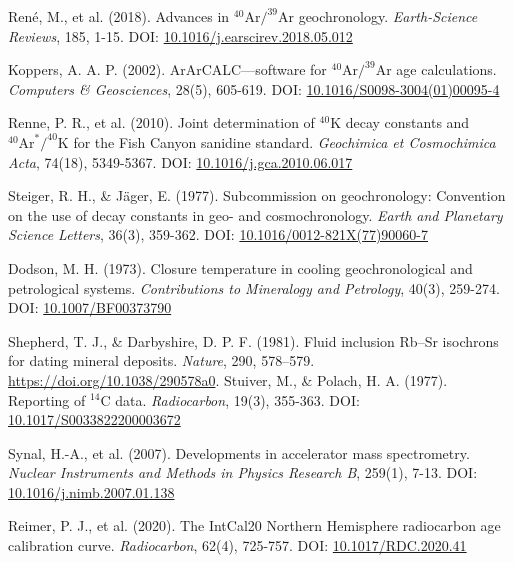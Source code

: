 \documentclass{article}
\begin{document}
\begin{thebibliography}{9}
René, M., et al. (2018). Advances in \(^{40}\text{Ar}/^{39}\text{Ar}\) geochronology. \textit{Earth-Science Reviews}, 185, 1-15.  
DOI: \href{https://doi.org/10.1016/j.earscirev.2018.05.012}{10.1016/j.earscirev.2018.05.012}

Koppers, A. A. P. (2002). ArArCALC—software for \(^{40}\text{Ar}/^{39}\text{Ar}\) age calculations. \textit{Computers & Geosciences}, 28(5), 605-619.  
DOI: \href{https://doi.org/10.1016/S0098-3004(01)00095-4}{10.1016/S0098-3004(01)00095-4}

Renne, P. R., et al. (2010). Joint determination of \(^{40}\text{K}\) decay constants and \(^{40}\text{Ar}^*/^{40}\text{K}\) for the Fish Canyon sanidine standard. \textit{Geochimica et Cosmochimica Acta}, 74(18), 5349-5367.  
DOI: \href{https://doi.org/10.1016/j.gca.2010.06.017}{10.1016/j.gca.2010.06.017}

Steiger, R. H., \& Jäger, E. (1977). Subcommission on geochronology: Convention on the use of decay constants in geo- and cosmochronology. \textit{Earth and Planetary Science Letters}, 36(3), 359-362.  
DOI: \href{https://doi.org/10.1016/0012-821X(77)90060-7}{10.1016/0012-821X(77)90060-7}

Dodson, M. H. (1973). Closure temperature in cooling geochronological and petrological systems. \textit{Contributions to Mineralogy and Petrology}, 40(3), 259-274.  
DOI: \href{https://doi.org/10.1007/BF00373790}{10.1007/BF00373790}

Shepherd, T. J., \& Darbyshire, D. P. F. (1981). Fluid inclusion Rb–Sr isochrons for dating mineral deposits. \textit{Nature}, 290, 578--579. \url{https://doi.org/10.1038/290578a0}.
Stuiver, M., \& Polach, H. A. (1977). Reporting of \(^{14}\text{C}\) data. \textit{Radiocarbon}, 19(3), 355-363.  
DOI: \href{https://doi.org/10.1017/S0033822200003672}{10.1017/S0033822200003672}

Synal, H.-A., et al. (2007). Developments in accelerator mass spectrometry. \textit{Nuclear Instruments and Methods in Physics Research B}, 259(1), 7-13.  
DOI: \href{https://doi.org/10.1016/j.nimb.2007.01.138}{10.1016/j.nimb.2007.01.138}

Reimer, P. J., et al. (2020). The IntCal20 Northern Hemisphere radiocarbon age calibration curve. \textit{Radiocarbon}, 62(4), 725-757.  
DOI: \href{https://doi.org/10.1017/RDC.2020.41}{10.1017/RDC.2020.41}


\end{thebibliography}
\end{document}
